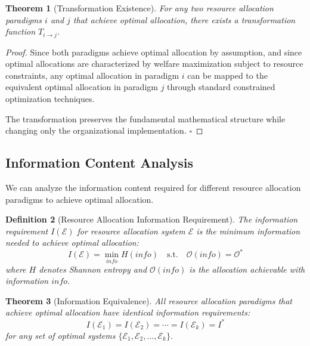 \documentclass[12pt,a4paper]{article}
\newtheorem{theorem}{Theorem}
\newtheorem{definition}[theorem]{Definition}
\begin{document}
\begin{theorem}[Transformation Existence]
For any two resource allocation paradigms $i$ and $j$ that achieve optimal allocation, there exists a transformation function $T_{i \to j}$.
\end{theorem}

\begin{proof}
Since both paradigms achieve optimal allocation by assumption, and since optimal allocations are characterized by welfare maximization subject to resource constraints, any optimal allocation in paradigm $i$ can be mapped to the equivalent optimal allocation in paradigm $j$ through standard constrained optimization techniques.

The transformation preserves the fundamental mathematical structure while changing only the organizational implementation. $\square$
\end{proof}

\subsection{Information Content Analysis}

We can analyze the information content required for different resource allocation paradigms to achieve optimal allocation.

\begin{definition}[Resource Allocation Information Requirement]
The information requirement $I(\mathcal{E})$ for resource allocation system $\mathcal{E}$ is the minimum information needed to achieve optimal allocation:
\begin{equation}
I(\mathcal{E}) = \min_{info} H(info) \quad \text{s.t.} \quad \mathcal{O}(info) = \mathcal{O}^*
\end{equation}
where $H$ denotes Shannon entropy and $\mathcal{O}(info)$ is the allocation achievable with information $info$.
\end{definition}

\begin{theorem}[Information Equivalence]
All resource allocation paradigms that achieve optimal allocation have identical information requirements:
\begin{equation}
I(\mathcal{E}_1) = I(\mathcal{E}_2) = \cdots = I(\mathcal{E}_k) = I^*
\end{equation}
for any set of optimal systems $\{\mathcal{E}_1, \mathcal{E}_2, \ldots, \mathcal{E}_k\}$.
\end{theorem}
\end{document}
